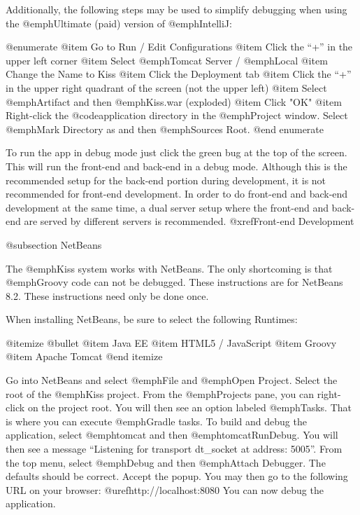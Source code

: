 Additionally, the following steps may be used to simplify debugging when using the @emph{Ultimate} (paid) version of @emph{IntelliJ}:



@enumerate
@item
Go to Run / Edit Configurations
@item
Click the ``+'' in the upper left corner
@item
Select @emph{Tomcat Server} / @emph{Local}
@item
Change the Name to Kiss
@item
Click the Deployment tab
@item
Click the ``+'' in the upper right quadrant of the screen (not the upper left)
@item
Select @emph{Artifact} and then @emph{Kiss.war} (exploded)
@item
Click "OK"
@item
Right-click the @code{application} directory in the @emph{Project} window.
Select @emph{Mark Directory as} and then @emph{Sources Root}.
@end enumerate

To run the app in debug mode just click the green bug at the top of the screen.  This will run the front-end and back-end 
in a debug mode.  Although this is the recommended setup for the back-end portion during development, it is not recommended
for front-end development.  In order to do front-end and back-end development at the same time, a dual server setup where
the front-end and back-end are served by different servers is recommended.    @xref{Front-end Development}

@subsection NetBeans

The @emph{Kiss} system works with NetBeans.  The only shortcoming is
that @emph{Groovy} code can not be debugged.  These instructions are
for NetBeans 8.2.  These instructions need only be done once.

When installing NetBeans, be sure to select the following Runtimes:

@itemize @bullet
@item
Java EE
@item
HTML5 / JavaScript
@item
Groovy
@item
Apache Tomcat
@end itemize

Go into NetBeans and select @emph{File} and @emph{Open Project}.
Select the root of the @emph{Kiss} project.  From the @emph{Projects}
pane, you can right-click on the project root.  You will then see an
option labeled @emph{Tasks}.  That is where you can execute
@emph{Gradle} tasks.  To build and debug the application, select
@emph{tomcat} and then @emph{tomcatRunDebug}.  You will then see a
message ``Listening for transport dt_socket at address: 5005''.  From
the top menu, select @emph{Debug} and then @emph{Attach Debugger}.
The defaults should be correct.  Accept the popup.  You may then go to
the following URL on your browser: @uref{http://localhost:8080}
You can now debug the application.

